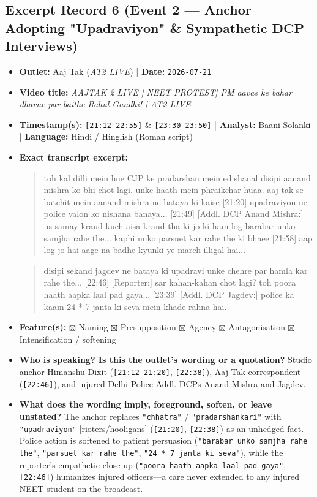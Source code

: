 \documentclass[10pt,a4paper]{article}
\begin{document}
\subsection*{Excerpt Record 6 (Event 2 --- Anchor Adopting "Upadraviyon" \& Sympathetic DCP Interviews)}
\begin{itemize}[leftmargin=1.5em, itemsep=3pt, topsep=4pt]
  \item \textbf{Outlet:} Aaj Tak (\textit{AT2 LIVE}) | \textbf{Date:} \texttt{2026-07-21}
  \item \textbf{Video title:} \textit{AAJTAK 2 LIVE | NEET PROTEST| PM aavas ke bahar dharne par baithe Rahul Gandhi! | AT2 LIVE}
  \item \textbf{Timestamp(s):} \texttt{[21:12--22:55]} \& \texttt{[23:30--23:50]} | \textbf{Analyst:} Baani Solanki | \textbf{Language:} Hindi / Hinglish (Roman script)
  \item \textbf{Exact transcript excerpt:}
    \begin{quote}\small\ttfamily [21:12] [Anchor:] toh kal dilli mein hue CJP ke pradarshan mein edishanal disipi aanand mishra ko bhi chot lagi. unke haath mein phraikchar huaa. aaj tak se batchit mein aanand mishra ne bataya ki kaise [21:20] upadraviyon ne police valon ko nishana banaya... [21:49] [Addl. DCP Anand Mishra:] us samay kraud kuch aisa kraud tha ki jo ki ham log barabar unko samjha rahe the... kaphi unko parsuet kar rahe the ki bhaee [21:58] aap log jo hai aage na badhe kyunki ye march illigal hai...\end{quote}
    \begin{quote}\small\ttfamily [22:38] [Anchor:] disipi sekand jagdev ne bataya ki upadravi unke chehre par hamla kar rahe the... [22:46] [Reporter:] sar kahan-kahan chot lagi? toh poora haath aapka laal pad gaya... [23:39] [Addl. DCP Jagdev:] police ka kaam 24 * 7 janta ki seva mein khade rahna hai.\end{quote}
  \item \textbf{Feature(s):} $\boxtimes$ Naming $\boxtimes$ Presupposition $\boxtimes$ Agency $\boxtimes$ Antagonisation $\boxtimes$ Intensification / softening
  \item \textbf{Who is speaking? Is this the outlet's wording or a quotation?} Studio anchor Himanshu Dixit (\texttt{[21:12--21:20]}, \texttt{[22:38]}), Aaj Tak correspondent (\texttt{[22:46]}), and injured Delhi Police Addl. DCPs Anand Mishra and Jagdev.
  \item \textbf{What does the wording imply, foreground, soften, or leave unstated?} The anchor replaces \texttt{"chhatra"} / \texttt{"pradarshankari"} with \texttt{"upadraviyon"} [rioters/hooligans] (\texttt{[21:20]}, \texttt{[22:38]}) as an unhedged fact. Police action is softened to patient persuasion (\texttt{"barabar unko samjha rahe the"}, \texttt{"parsuet kar rahe the"}, \texttt{"24 * 7 janta ki seva"}), while the reporter's empathetic close-up (\texttt{"poora haath aapka laal pad gaya"}, \texttt{[22:46]}) humanizes injured officers---a care never extended to any injured NEET student on the broadcast.

\end{itemize}
\end{document}

